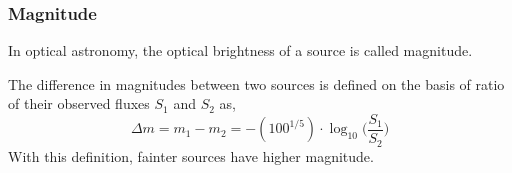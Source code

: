 %

\subsubsection{Magnitude}
In optical astronomy, the optical brightness of a source is called magnitude.

The difference in magnitudes between two sources is defined on the basis of ratio of their observed fluxes $ {S}_{1} $ and $ {S}_{2} $ as,
\begin{equation}
	\Delta {m}= {m}_{1}-{m}_{2}=-(100^{1/5}) \cdot \log_{10} \bigg(\frac{{S}_{1}}{{S}_{2}}\bigg)
\end{equation}
With this definition, fainter sources have higher magnitude.

